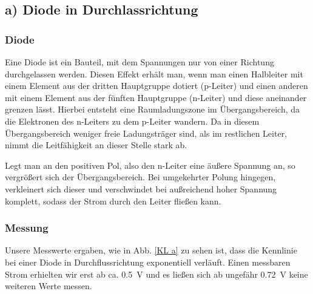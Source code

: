 \documentclass[11pt,a4paper,titlepage, ngerman]{article}
\begin{document}
		\subsection{a) Diode in Durchlassrichtung} 
			\label{a)}
			
			\subsubsection*{Diode}
				\label{Diode}
				
				Eine Diode ist ein Bauteil, mit dem Spannungen nur von einer Richtung durchgelassen werden.
				Diesen Effekt erhält man, wenn man einen Halbleiter mit einem Element aus der dritten Hauptgruppe dotiert (p-Leiter) und einen anderen mit einem Element aus der fünften Hauptgruppe (n-Leiter) und diese aneinander grenzen lässt.
				Hierbei entsteht eine Raumladungszone im Übergangsbereich, da die Elektronen des n-Leiters zu dem p-Leiter wandern.
				Da in diesem Übergangsbereich weniger freie Ladungsträger sind, als im restlichen Leiter, nimmt die Leitfähigkeit an dieser Stelle stark ab.
				
				Legt man an den positiven Pol, also den n-Leiter eine äußere Spannung an, so vergrößert sich der Übergangsbereich.
				Bei umgekehrter Polung hingegen, verkleinert sich dieser und verschwindet bei außreichend hoher Spannung komplett, sodass der Strom durch den Leiter fließen kann. 
			
			\subsubsection*{Messung}
				
				Unsere Messwerte ergaben, wie in Abb. \ref{KL a} zu sehen ist, dass die Kennlinie bei einer Diode in Durchflussrichtung exponentiell verläuft.
				Einen messbaren Strom erhielten wir erst ab ca. \SI{0.5}{\V} und es ließen sich ab ungefähr \SI{0.72}{\V} keine weiteren Werte messen. %
				
\end{document}
